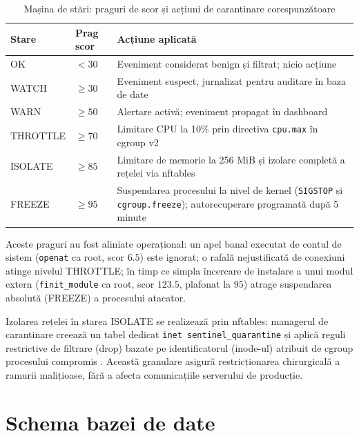 \begin{table}[htbp]
\begin{center}
\begin{tabular}{|p{65pt}|p{70pt}|p{175pt}|}
\hline
\textbf{Stare} & \textbf{Prag scor} & \textbf{Acțiune aplicată} \\
\hline\hline
OK       & $< 30$    & Eveniment considerat benign și filtrat; nicio acțiune \\
\hline
WATCH    & $\geq 30$ & Eveniment suspect, jurnalizat pentru auditare în baza de date \\
\hline
WARN     & $\geq 50$ & Alertare activă; eveniment propagat în dashboard \\
\hline
THROTTLE & $\geq 70$ & Limitare CPU la 10\% prin directiva \texttt{cpu.max} în cgroup v2 \\
\hline
ISOLATE  & $\geq 85$ & Limitare de memorie la 256 MiB și izolare completă a rețelei via nftables \\
\hline
FREEZE   & $\geq 95$ & Suspendarea procesului la nivel de kernel (\texttt{SIGSTOP} și \texttt{cgroup.freeze}); autorecuperare programată după 5 minute \\
\hline
\end{tabular}
\end{center}
\caption{Mașina de stări: praguri de scor și acțiuni de carantinare corespunzătoare}
\label{tab:states}
\end{table}

\par Aceste praguri au fost aliniate operațional: un apel banal executat de contul de sistem (\texttt{openat} ca root, scor $6.5$) este ignorat; o rafală nejustificată de conexiuni atinge nivelul THROTTLE; în timp ce simpla încercare de instalare a unui modul extern (\texttt{finit\_module} ca root, scor $123.5$, plafonat la $95$) atrage suspendarea absolută (FREEZE) a procesului atacator.

\par Izolarea rețelei în starea ISOLATE se realizează prin nftables: managerul de carantinare creează un tabel dedicat \texttt{inet sentinel\_quarantine} și aplică reguli restrictive de filtrare (drop) bazate pe identificatorul (inode-ul) atribuit de cgroup procesului compromis \cite{Menage2007}. Această granulare asigură restricționarea chirurgicală a ramurii malițioase, fără a afecta comunicațiile serverului de producție.


\section{Schema bazei de date}
\label{sec:db_schema}

